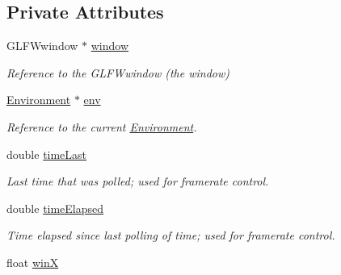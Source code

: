 \subsection*{Private Attributes}
\begin{DoxyCompactItemize}
\item 
G\+L\+F\+Wwindow $\ast$ \hyperlink{class_game_ad9bc7cf39168a1ceaf77d6177116aa94}{window}\hypertarget{class_game_ad9bc7cf39168a1ceaf77d6177116aa94}{}\label{class_game_ad9bc7cf39168a1ceaf77d6177116aa94}

\begin{DoxyCompactList}\small\item\em Reference to the G\+L\+F\+Wwindow (the window) \end{DoxyCompactList}\item 
\hyperlink{class_environment}{Environment} $\ast$ \hyperlink{class_game_aacf863ae343868f6c6b83f0f324d50f1}{env}\hypertarget{class_game_aacf863ae343868f6c6b83f0f324d50f1}{}\label{class_game_aacf863ae343868f6c6b83f0f324d50f1}

\begin{DoxyCompactList}\small\item\em Reference to the current \hyperlink{class_environment}{Environment}. \end{DoxyCompactList}\item 
double \hyperlink{class_game_a1022a000bf009876854caffdec67f906}{time\+Last}\hypertarget{class_game_a1022a000bf009876854caffdec67f906}{}\label{class_game_a1022a000bf009876854caffdec67f906}

\begin{DoxyCompactList}\small\item\em Last time that was polled; used for framerate control. \end{DoxyCompactList}\item 
double \hyperlink{class_game_a2309eef4e2db7aab3c08f695b51f3958}{time\+Elapsed}\hypertarget{class_game_a2309eef4e2db7aab3c08f695b51f3958}{}\label{class_game_a2309eef4e2db7aab3c08f695b51f3958}

\begin{DoxyCompactList}\small\item\em Time elapsed since last polling of time; used for framerate control. \end{DoxyCompactList}\item 
float \hyperlink{class_game_a5262e462eeb61d8ee8424eceff2b3c43}{winX}\hypertarget{class_game_a5262e462eeb61d8ee8424eceff2b3c43}{}\label{class_game_a5262e462eeb61d8ee8424eceff2b3c43}


\end{DoxyCompactItemize}
